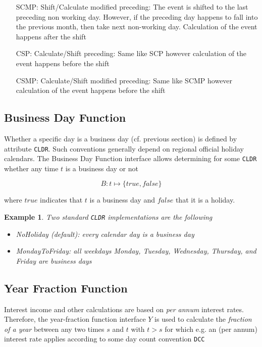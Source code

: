 \documentclass[9pt,oneside]{amsart}
\newtheorem{example}{Example}
\newcommand{\attr}[1]{\texttt{#1}}
\begin{document}
\begin{multicols}{2}
\begin{itemize}
	\item[SCMP:] Shift/Calculate modified preceding: The event is shifted to the last preceding non working day. However, if the preceding day happens to fall into the previous month, then take next non-working day. Calculation of the event happens after the shift

	\item[CSP:] Calculate/Shift preceding: Same like SCP however calculation of the event happens before the shift

	\item[CSMP:] Calculate/Shift modified preceding: Same like SCMP however calculation of the event happens before the shift
\end{itemize}



\subsection{Business Day Function}

Whether a specific day is a business day (cf. previous section) is defined by attribute \attr{CLDR}. Such conventions generally depend on regional official holiday calendars. The Business Day Function interface allows determining for some \attr{CLDR} whether any time $t$ is a business day or not

\[
	B: t \mapsto \{true, false\}
\]

where $true$ indicates that $t$ is a business day and $false$ that it is a holiday.


\begin{example}
Two standard \attr{CLDR} implementations are the following
\begin{itemize}
	\item NoHoliday (default): every calendar day is a business day

	\item MondayToFriday: all weekdays Monday, Tuesday, Wednesday, Thursday, and Friday are business days
\end{itemize}
\end{example}


\subsection{Year Fraction Function}

Interest income and other calculations are based on \textit{per annum} interest rates. Therefore, the year-fraction function interface $Y$ is used to calculate the \textit{fraction of a year} between any two times $s$ and $t$ with $t>s$ for which e.g. an (per annum) interest rate applies according to some day count convention \attr{DCC}


\end{multicols}
\end{document}
